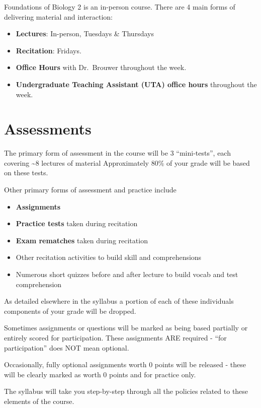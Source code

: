 \documentclass[
]{book}
\providecommand{\tightlist}{%
  \setlength{\itemsep}{0pt}\setlength{\parskip}{0pt}}
\begin{document}
Foundations of Biology 2 is an in-person course. There are 4 main forms of delivering material and interaction:

\begin{itemize}
\tightlist
\item
  \textbf{Lectures}: In-person, Tuesdays \& Thursdays
\item
  \textbf{Recitation}: Fridays.
\item
  \textbf{Office Hours} with Dr.~Brouwer throughout the week.
\item
  \textbf{Undergraduate Teaching Assistant (UTA) office hours} throughout the week.
\end{itemize}

\hypertarget{assessments}{%
\section{Assessments}\label{assessments}}

The primary form of assessment in the course will be 3 ``mini-tests'', each covering \textasciitilde8 lectures of material
Approximately 80\% of your grade will be based on these tests.

Other primary forms of assessment and practice include

\begin{itemize}
\tightlist
\item
  \textbf{Assignments}
\item
  \textbf{Practice tests} taken during recitation
\item
  \textbf{Exam rematches} taken during recitation
\item
  Other recitation activities to build skill and comprehensions
\item
  Numerous short quizzes before and after lecture to build vocab and test comprehension
\end{itemize}

As detailed elsewhere in the syllabus a portion of each of these individuals components of your grade will be dropped.

Sometimes assignments or questions will be marked as being based partially or entirely scored for participation. These assignments ARE required - ``for participation'' does NOT mean optional.

Occasionally, fully optional assignments worth 0 points will be released - these will be clearly marked as worth 0 points and for practice only.

The syllabus will take you step-by-step through all the policies related to these elements of the course.
\end{document}
